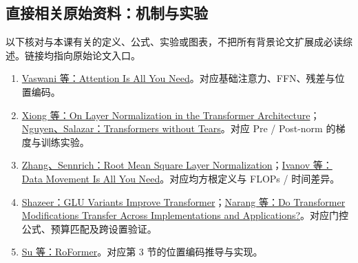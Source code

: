 \documentclass[UTF8,fontset=fandol,zihao=-4,a4paper]{ctexart}
\newcommand{\nextpage}{\clearpage}
\begin{document}
\subsection{直接相关原始资料：机制与实验}
以下核对与本课有关的定义、公式、实验或图表，不把所有背景论文扩展成必读综述。链接均指向原始论文入口。
\begin{enumerate}
\item \href{https://arxiv.org/abs/1706.03762}{Vaswani 等：Attention Is All You Need}。对应基础注意力、FFN、残差与位置编码。
\item \href{https://arxiv.org/abs/2002.04745}{Xiong 等：On Layer Normalization in the Transformer Architecture}；\href{https://arxiv.org/abs/1910.05895}{Nguyen、Salazar：Transformers without Tears}。对应 Pre / Post-norm 的梯度与训练实验。
\item \href{https://arxiv.org/abs/1910.07467}{Zhang、Sennrich：Root Mean Square Layer Normalization}；\href{https://arxiv.org/abs/2007.00072}{Ivanov 等：Data Movement Is All You Need}。对应均方根定义与 FLOPs / 时间差异。
\item \href{https://arxiv.org/abs/2002.05202}{Shazeer：GLU Variants Improve Transformer}；\href{https://arxiv.org/abs/2102.11972}{Narang 等：Do Transformer Modifications Transfer Across Implementations and Applications?}。对应门控公式、预算匹配及跨设置验证。
\item \href{https://arxiv.org/abs/2104.09864}{Su 等：RoFormer}。对应第 3 节的位置编码推导与实现。
\end{enumerate}

\nextpage
\end{document}

